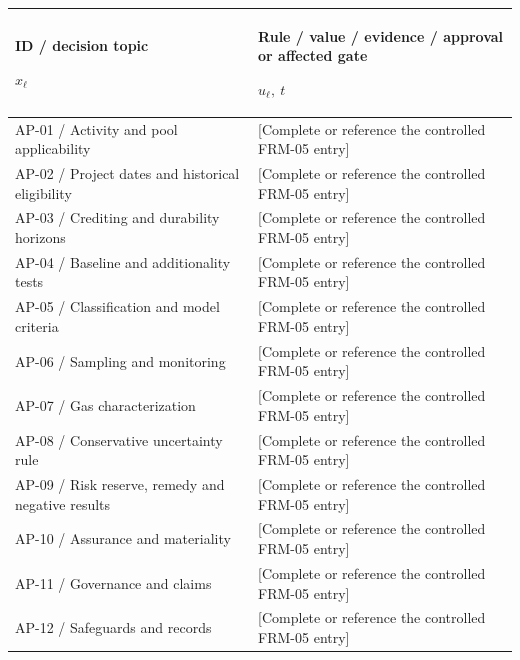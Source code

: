 {\sffamily\fontsize{8.3}{10.3}\selectfont\begin{longtable}{@{}P{72.45mm} P{96.04mm}@{}}
\toprule
\textbf{ID / decision topic}\par {\normalfont\fontsize{8.2}{10}\selectfont $x_{\ell}$} & \textbf{Rule / value / evidence / approval or affected gate}\par {\normalfont\fontsize{8.2}{10}\selectfont $u_{\ell},\ t$}\\\midrule\endhead
\rule{0pt}{7.7mm}AP-01 / Activity and pool applicability & [Complete or reference the controlled FRM-05 entry]\\\hline
\rule{0pt}{7.7mm}AP-02 / Project dates and historical eligibility & [Complete or reference the controlled FRM-05 entry]\\\hline
\rule{0pt}{7.7mm}AP-03 / Crediting and durability horizons & [Complete or reference the controlled FRM-05 entry]\\\hline
\rule{0pt}{7.7mm}AP-04 / Baseline and additionality tests & [Complete or reference the controlled FRM-05 entry]\\\hline
\rule{0pt}{7.7mm}AP-05 / Classification and model criteria & [Complete or reference the controlled FRM-05 entry]\\\hline
\rule{0pt}{7.7mm}AP-06 / Sampling and monitoring & [Complete or reference the controlled FRM-05 entry]\\\hline
\rule{0pt}{7.7mm}AP-07 / Gas characterization & [Complete or reference the controlled FRM-05 entry]\\\hline
\rule{0pt}{7.7mm}AP-08 / Conservative uncertainty rule & [Complete or reference the controlled FRM-05 entry]\\\hline
\rule{0pt}{7.7mm}AP-09 / Risk reserve, remedy and negative results & [Complete or reference the controlled FRM-05 entry]\\\hline
\rule{0pt}{7.7mm}AP-10 / Assurance and materiality & [Complete or reference the controlled FRM-05 entry]\\\hline
\rule{0pt}{7.7mm}AP-11 / Governance and claims & [Complete or reference the controlled FRM-05 entry]\\\hline
\rule{0pt}{7.7mm}AP-12 / Safeguards and records & [Complete or reference the controlled FRM-05 entry]\\\hline
\end{longtable}}
